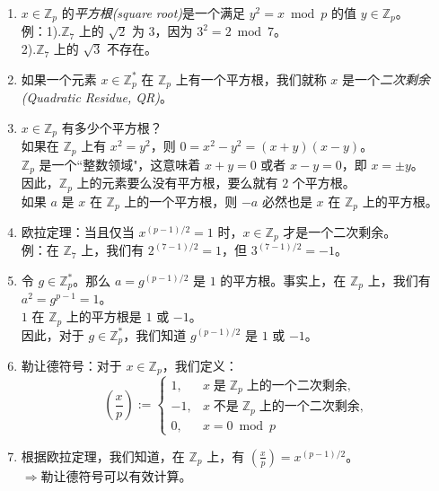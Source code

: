 \begin{enumerate}
	\item $x\in\mathbb{Z}_p$ 的\emph{平方根(square root)}是一个满足 $y^2=x \bmod p$ 的值 $y\in\mathbb{Z}_p$。\\
    例：1).\quad $\mathbb{Z}_7$ 上的 $\sqrt{2}$ 为 $3$，因为 $3^2=2 \bmod 7$。\\
    \hspace*{18pt} 2).\quad $\mathbb{Z}_7$ 上的 $\sqrt{3}$ 不存在。
	\item 如果一个元素 $x\in\mathbb{Z}_p^*$ 在 $\mathbb{Z}_p$ 上有一个平方根，我们就称 $x$ 是一个\emph{二次剩余(Quadratic Residue, QR)}。
	\item $x\in\mathbb{Z}_p$ 有多少个平方根？\\
    如果在 $\mathbb{Z}_p$ 上有 $x^2=y^2$，则 $0=x^2-y^2=(x+y)(x-y)$。\\
    $\mathbb{Z}_p$ 是一个``整数领域"，这意味着 $x+y=0$ 或者 $x-y=0$，即 $x=\pm y$。\\
    因此，$\mathbb{Z}_p$ 上的元素要么没有平方根，要么就有 $2$ 个平方根。\\
    如果 $a$ 是 $x$ 在 $\mathbb{Z}_p$ 上的一个平方根，则 $-a$ 必然也是 $x$ 在 $\mathbb{Z}_p$ 上的平方根。
	\item 欧拉定理：当且仅当 $x^{(p-1)/2}=1$ 时，$x\in\mathbb{Z}_p$ 才是一个二次剩余。\\
    例：在 $\mathbb{Z}_7$ 上，我们有 $2^{(7-1)/2}=1$，但 $3^{(7-1)/2}=-1$。
	\item 令 $g\in\mathbb{Z}_p^*$。那么 $a=g^{(p-1)/2}$ 是 $1$ 的平方根。事实上，在 $\mathbb{Z}_p$ 上，我们有 $a^2=g^{p-1}=1$。\\
    $1$ 在 $\mathbb{Z}_p$ 上的平方根是 $1$ 或 $-1$。\\
    因此，对于 $g\in\mathbb{Z}_p^*$，我们知道 $g^{(p-1)/2}$ 是 $1$ 或 $-1$。
	\item 勒让德符号：对于 $x\in\mathbb{Z}_p$，我们定义：
    \[
    \left(\frac{x}{p}\right):=
    \left\{
    	\begin{array}{rl}
    	1,  &x\;\text{是}\;\mathbb{Z}_p\;\text{上的一个二次剩余},\\
    	-1, &x\;\text{不是}\;\mathbb{Z}_p\;\text{上的一个二次剩余},\\
    	0,  & x=0 \bmod p
    \end{array}
    \right.
    \]
	\item 根据欧拉定理，我们知道，在  $\mathbb{Z}_p$ 上，有 $\left(\frac{x}{p}\right)=x^{(p-1)/2}$。\\
	$\Longrightarrow$\quad 勒让德符号可以有效计算。

\end{enumerate}
